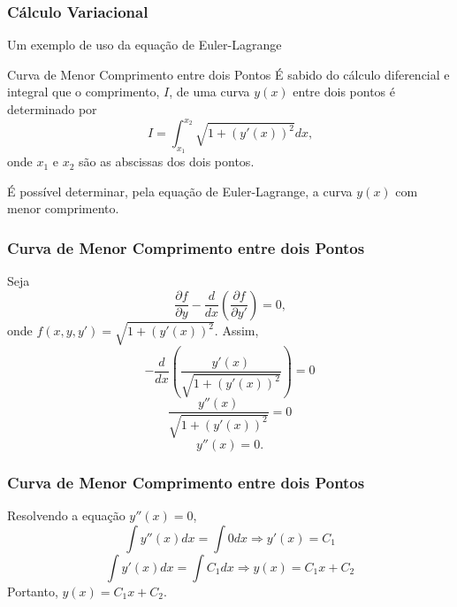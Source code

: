 \documentclass{beamer}
\begin{document}
	\begin{frame}
		\frametitle{Cálculo Variacional}
		\justify
		
		Um exemplo de uso da equação de Euler-Lagrange
		\pause
		\begin{block}{Curva de Menor Comprimento entre dois Pontos}
			É sabido do cálculo diferencial e integral que o comprimento, $I$, de uma curva $y(x)$ entre dois pontos é determinado por
			$$
				I=\int_{x_1}^{x_2} \sqrt{1+(y'(x))^2} dx
				\text{,}
			$$
			onde $x_1$ e $x_2$ são as abscissas dos dois pontos.
			
			É possível determinar, pela equação de Euler-Lagrange, a curva $y(x)$ com menor comprimento.
		\end{block}
	\end{frame}
	
	\begin{frame}
		\frametitle{Curva de Menor Comprimento entre dois Pontos}
		\justify
		
		Seja
		$$
			\frac{\partial f}{\partial y}
			-
			\frac{d}{dx} \left (
				\frac{\partial f}{\partial y'}
			\right )
			= 0
			\text{,}
		$$
		onde $f(x, y, y')=\sqrt{1+(y'(x))^2}$. \pause Assim,
		$$
			-\frac{d}{dx} \left (
				\frac{y'(x)}{\sqrt{1+(y'(x))^2}}
			\right )
			= 0
		$$
		\pause
		$$
			\frac{y''(x)}{
				\sqrt{1+(y'(x))^2}
			}
			= 0
		$$
		\pause
		$$
			y''(x)=0
			\text{.}
		$$
	\end{frame}
	
	\begin{frame}
		\frametitle{Curva de Menor Comprimento entre dois Pontos}
		\justify
		
		Resolvendo a equação $y''(x)=0$\pause ,
		$$
			\int y''(x)dx = \int 0 dx \Longrightarrow y'(x) = C_1
		$$
		\pause
		$$
			\int y'(x)dx = \int C_1 dx \Longrightarrow y(x) = C_1 x + C_2
		$$
		\pause
		Portanto, $y(x)=C_1 x + C_2$.
	\end{frame}

\end{document}
